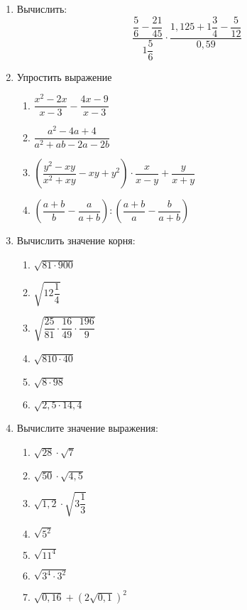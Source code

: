 \documentclass[12pt, a4paper]{article}
\begin{document}
		

\begin{enumerate}
	\item Вычислить:
	$$\dfrac{\dfrac{5}{6}-\dfrac{21}{45}}{1\dfrac{5}{6}}\cdot\dfrac{1,125+1\dfrac{3}{4}-\dfrac{5}{12}}{0,59}$$
	\item Упростить выражение
	\begin{multicols}{2}
		\begin{enumerate}[label=\asbuk*)]
			\item $\dfrac{x^2-2x}{x-3}-\dfrac{4x-9}{x-3}$
			\item $\dfrac{a^2-4a+4}{a^2+ab-2a-2b}$
			\item $\left(\dfrac{y^2-xy}{x^2+xy}-xy+y^2\right)\cdot\dfrac{x}{x-y}+\dfrac{y}{x+y}$
			\item $\left(\dfrac{a+b}{b}-\dfrac{a}{a+b}\right):\left(\dfrac{a+b}{a}-\dfrac{b}{a+b}\right)$
		\end{enumerate}
	\end{multicols}
	\item Вычислить значение корня:
	\begin{multicols}{2}
		\begin{enumerate}[label=\asbuk*)]
			\item $\sqrt{81\cdot900}$
			\item $\sqrt{12\dfrac{1}{4}}$
			\item $\sqrt{\dfrac{25}{81}\cdot\dfrac{16}{49}\cdot\dfrac{196}{9}}$
			\item $\sqrt{810\cdot40}$
			\item $\sqrt{8\cdot98}$
			\item $\sqrt{2,5\cdot14,4}$
		\end{enumerate}
	\end{multicols}
	\item Вычислите значение выражения:
	\begin{multicols}{2}
		\begin{enumerate}[label=\asbuk*)]
			\item $\sqrt{28}\cdot\sqrt{7}$
			\item $\sqrt{50}\cdot\sqrt{4,5}$
			\item $\sqrt{1,2}\cdot\sqrt{3\dfrac{1}{3}}$
			\item $\sqrt{5^2}$
			\item $\sqrt{11^4}$
			\item $\sqrt{3^4\cdot3^2}$
			\item $\sqrt{0,16}+(2\sqrt{0,1})^2$

\end{enumerate}
\end{multicols}
\end{enumerate}
\end{document}
